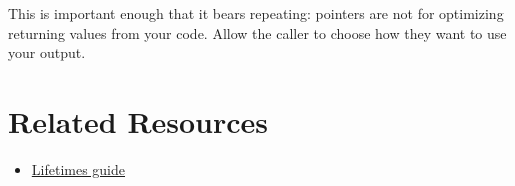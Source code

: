 \documentclass[]{article}
\begin{document}
This is important enough that it bears repeating: pointers are not for
optimizing returning values from your code. Allow the caller to choose
how they want to use your output.

\section{Related Resources}\label{related-resources}

\begin{itemize}
\itemsep1pt\parskip0pt
\item
  \href{guide-lifetimes.html}{Lifetimes guide}
\end{itemize}
\end{document}
